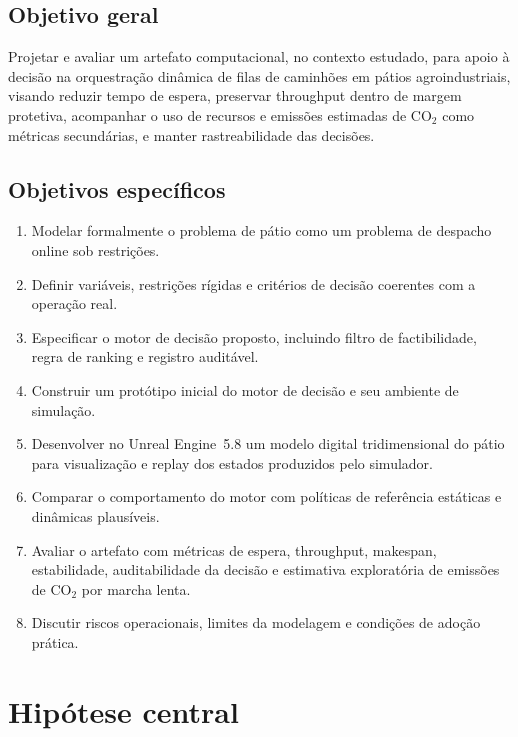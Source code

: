 \documentclass[
  12pt,
  oneside,
  a4paper,
  sumario=tradicional,
  brazil
]{abntex2}
\begin{document}
\subsection{Objetivo geral}
Projetar e avaliar um artefato computacional, no contexto estudado, para apoio \`a decis\~ao na orquestra\c{c}\~ao din\^amica de filas de caminh\~oes em p\'atios agroindustriais, visando reduzir tempo de espera, preservar throughput dentro de margem protetiva, acompanhar o uso de recursos e emiss\~oes estimadas de $\mathrm{CO_2}$ como m\'etricas secund\'arias, e manter rastreabilidade das decis\~oes.

\subsection{Objetivos específicos}
\begin{enumerate}[leftmargin=1.27cm,itemsep=0pt,topsep=0pt,parsep=0pt,partopsep=0pt]
  \item Modelar formalmente o problema de p\'atio como um problema de despacho online sob restri\c{c}\~oes.
  \item Definir vari\'aveis, restri\c{c}\~oes r\'igidas e crit\'erios de decis\~ao coerentes com a opera\c{c}\~ao real.
  \item Especificar o motor de decis\~ao proposto, incluindo filtro de factibilidade, regra de ranking e registro audit\'avel.
  \item Construir um prot\'otipo inicial do motor de decis\~ao e seu ambiente de simula\c{c}\~ao.
  \item Desenvolver no Unreal Engine~5.8 um modelo digital tridimensional do p\'atio para visualiza\c{c}\~ao e replay dos estados produzidos pelo simulador.
  \item Comparar o comportamento do motor com pol\'iticas de refer\^encia est\'aticas e din\^amicas plaus\'iveis.
  \item Avaliar o artefato com m\'etricas de espera, throughput, makespan, estabilidade, auditabilidade da decis\~ao e estimativa explorat\'oria de emiss\~oes de $\mathrm{CO_2}$ por marcha lenta.
  \item Discutir riscos operacionais, limites da modelagem e condi\c{c}\~oes de ado\c{c}\~ao pr\'atica.
\end{enumerate}

\section{Hipótese central}
\end{document}
